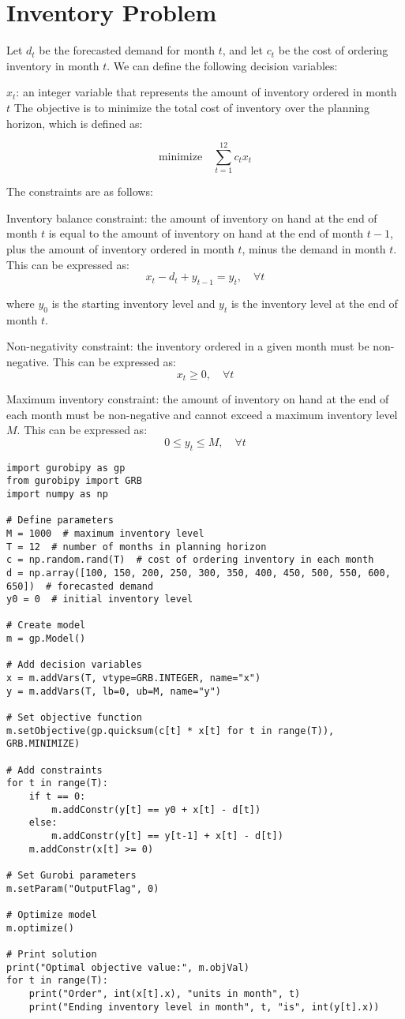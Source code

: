 \section{Inventory Problem}
Let $d_t$ be the forecasted demand for month $t$, and let $c_t$ be the cost of ordering inventory in month $t$. We can define the following decision variables:

$x_t$: an integer variable that represents the amount of inventory ordered in month $t$
The objective is to minimize the total cost of inventory over the planning horizon, which is defined as:

$$\text{minimize} \quad \sum_{t=1}^{12} c_t x_t$$

The constraints are as follows:

Inventory balance constraint: the amount of inventory on hand at the end of month $t$ is equal to the amount of inventory on hand at the end of month $t-1$, plus the amount of inventory ordered in month $t$, minus the demand in month $t$. This can be expressed as:
$$x_t - d_t + y_{t-1} = y_t, \quad \forall t$$

where $y_0$ is the starting inventory level and $y_t$ is the inventory level at the end of month $t$.

Non-negativity constraint: the inventory ordered in a given month must be non-negative. This can be expressed as:
$$x_t \geq 0, \quad \forall t$$

Maximum inventory constraint: the amount of inventory on hand at the end of each month must be non-negative and cannot exceed a maximum inventory level $M$. This can be expressed as:
$$0 \leq y_t \leq M, \quad \forall t$$

\begin{verbatim}
import gurobipy as gp
from gurobipy import GRB
import numpy as np

# Define parameters
M = 1000  # maximum inventory level
T = 12  # number of months in planning horizon
c = np.random.rand(T)  # cost of ordering inventory in each month
d = np.array([100, 150, 200, 250, 300, 350, 400, 450, 500, 550, 600, 650])  # forecasted demand
y0 = 0  # initial inventory level

# Create model
m = gp.Model()

# Add decision variables
x = m.addVars(T, vtype=GRB.INTEGER, name="x")
y = m.addVars(T, lb=0, ub=M, name="y")

# Set objective function
m.setObjective(gp.quicksum(c[t] * x[t] for t in range(T)), GRB.MINIMIZE)

# Add constraints
for t in range(T):
    if t == 0:
        m.addConstr(y[t] == y0 + x[t] - d[t])
    else:
        m.addConstr(y[t] == y[t-1] + x[t] - d[t])
    m.addConstr(x[t] >= 0)

# Set Gurobi parameters
m.setParam("OutputFlag", 0)

# Optimize model
m.optimize()

# Print solution
print("Optimal objective value:", m.objVal)
for t in range(T):
    print("Order", int(x[t].x), "units in month", t)
    print("Ending inventory level in month", t, "is", int(y[t].x))

\end{verbatim}

